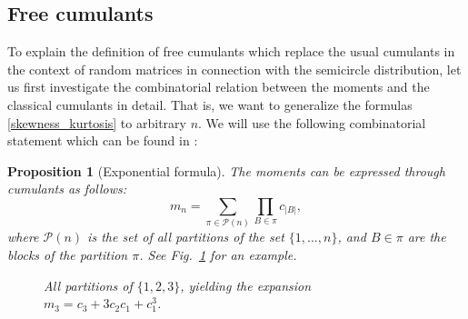 \documentclass[letterpaper,11pt,oneside,reqno]{amsart}
\numberwithin{equation}{section}
\newtheorem{proposition}{Proposition}[section]
\theoremstyle{definition}
\begin{document}

\subsection{Free cumulants} %
\label{sub:free_cumulants}

To explain the definition of free cumulants which replace the usual
cumulants in the context of random matrices in connection with the semicircle
distribution, let us first investigate the combinatorial relation between the 
moments and the classical cumulants in detail. That is, we 
want to generalize the formulas \eqref{skewness_kurtosis} to arbitrary $n$.
We will use the following combinatorial statement which can be found in 
\cite[Section 5.1]{Stanley1999}:
\begin{proposition}[Exponential formula]\label{prop:expon_thm}
	The moments can be expressed through cumulants as follows:
	\begin{equation}\label{moments_via_cumulants}
	     m_n=\sum_{\pi\in\mathcal{P}(n)} \prod_{B\in\pi} c_{|B|},
	\end{equation}
	where $\mathcal{P}(n)$ is the set of all partitions of the set 
	$\{1,...,n\}$, and $B\in \pi$ are the blocks of the partition $\pi$.
	See Fig.~\ref{fig:partition} for an example.
	\begin{figure}[htbp]
		\caption{All partitions of $\{1,2,3\}$, yielding the 
		expansion $m_3=c_3+3c_2c_1+c_1^{3}$.}
		\label{fig:partition}
	\end{figure}
\end{proposition}
\end{document}
